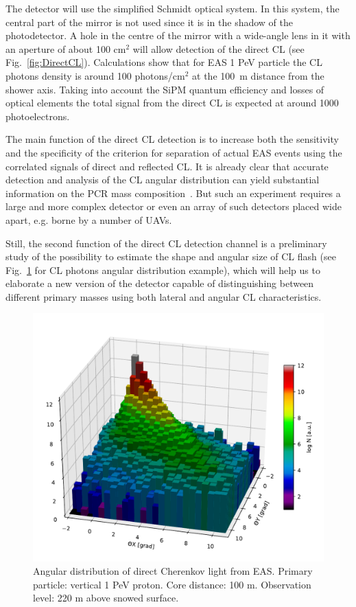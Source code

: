 \documentclass[a4paper,11pt]{article}
\begin{document}
The detector will use the simplified Schmidt optical system. In this system, the central part of the mirror is not used since it is in the shadow of the photodetector. A hole in the centre of the mirror with a wide-angle lens in it with an aperture of about 100 cm$^2$ will allow detection of the direct CL (see Fig.~\ref{fig:DirectCL}). Calculations show that for EAS 1 PeV particle the CL photons density is around 100 photons/cm$^2$ at the 100~m distance from the shower axis. Taking into account the SiPM quantum efficiency and losses of optical elements the total signal from the direct CL is expected at around 1000 photoelectrons.

The main function of the direct CL detection is to increase both the sensitivity and the specificity of the criterion for separation of actual EAS events using the correlated signals of direct and reflected CL. It is already clear that accurate detection and analysis of the CL angular distribution can yield substantial information on the PCR mass composition~\cite{Gal18a,Gal18b}. But such an experiment requires a large and more complex detector or even an array of such detectors placed wide apart, e.g. borne by a number of UAVs.

Still, the second function of the direct CL detection channel is a preliminary study of the possibility to estimate the shape and angular size of CL flash (see Fig.~\ref{fig:CLangular} for CL photons angular distribution example), which will help us to elaborate a new version of the detector capable of distinguishing between different primary masses using both lateral and angular CL characteristics.

\begin{figure}[t]
\centering %
\includegraphics[height=.4\textheight]{ang_distr.pdf}
\caption{Angular distribution of direct Cherenkov light from EAS. Primary particle: vertical 1 PeV proton. Core distance: 100 m. Observation level: 220 m above snowed surface.}
\label{fig:CLangular}
\end{figure}
\end{document}
